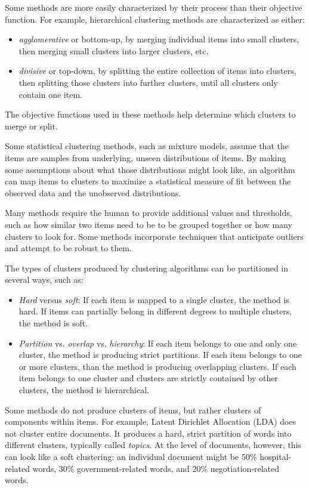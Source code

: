 Some methods are more easily characterized by their process than their objective function. For example, hierarchical clustering methods are characterized as either:

\begin{itemize}
\item {\it agglomerative} or bottom-up, by merging individual items into small clusters, then merging small clusters into larger clusters, etc.
\item {\it divisive} or top-down, by splitting the entire collection of items into clusters, then splitting those clusters into further clusters, until all clusters only contain one item.
\end{itemize}

The objective functions used in these methods help determine which clusters to merge or split.

Some statistical clustering methods, such as mixture models, assume that the items are samples from underlying, unseen distributions of items. By making some assumptions about what those distributions might look like, an algorithm can map items to clusters to maximize a statistical measure of fit between the observed data and the unobserved distributions.

Many methods require the human to provide additional values and thresholds, such as how similar two items need to be to be grouped together or how many clusters to look for. Some methods incorporate techniques that anticipate outliers and attempt to be robust to them.

The types of clusters produced by clustering algorithms can be partitioned in several ways, such as:

\begin{itemize}
\item {\it Hard} versus {\it soft}: If each item is mapped to a single cluster, the method is hard. If items can partially belong in different degrees to multiple clusters, the method is soft.
\item {\it Partition} vs. {\it overlap} vs. {\it hierarchy}: If each item belongs to one and only one cluster, the method is producing strict partitions. If each item belongs to one or more clusters, than the method is producing overlapping clusters. If each item belongs to one cluster and clusters are strictly contained by other clusters, the method is hierarchical.
\end{itemize}

Some methods do not produce clusters of items, but rather clusters of components within items. For example, Latent Dirichlet Allocation (LDA) does not cluster entire documents. It produces a hard, strict partition of words into different clusters, typically called {\it topics}. At the level of documents, however, this can look like a soft clustering: an individual document might be 50\% hospital-related words, 30\% government-related words, and 20\% negotiation-related words.

